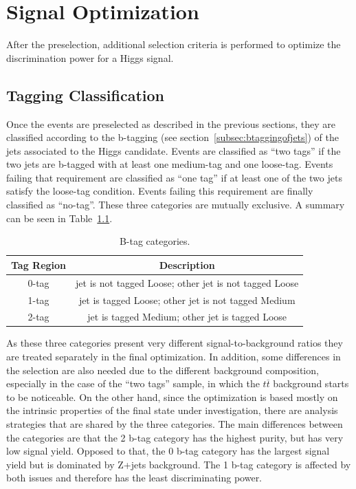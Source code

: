 

\chapter{Signal Optimization}


After the preselection, additional selection criteria is performed to optimize the discrimination power for a Higgs signal.

\section{Tagging Classification}

Once the events are preselected as described in the previous sections, they are classified according to the b-tagging (see section~\ref{subsec:btaggingofjets})  of the jets associated to the Higgs candidate. Events are classified as ``two tags'' if the two jets are b-tagged with at least one medium-tag and one loose-tag. Events failing that requirement are classified as ``one tag'' if at least one of the two jets satisfy the loose-tag condition. Events failing this requirement are finally classified as ``no-tag''.  These three categories are mutually exclusive.  A summary can be seen in Table~\ref{tab:btagcateg}.

\begin{table}[htb!]
\caption{ 
B-tag categories.
}
\label{tab:btagcateg}
\vspace*{\medskipamount}
\begin{center}
\small
\begin{tabular}{|c|c|}
\hline
Tag Region & Description\\
\hline
0-tag & jet is not tagged Loose; other jet is not tagged Loose \\
1-tag & jet is tagged Loose; other jet is not tagged Medium \\
2-tag & jet is tagged Medium; other jet is tagged Loose \\
\hline
\end{tabular}
\end{center}
\end{table}

As these three categories present very different signal-to-background ratios they are treated separately in the final optimization. In addition, some differences in the selection are also needed due to the different background composition, especially in the case of the ``two tags'' sample, in which the $t\overline{t}$ background starts to be noticeable. On the other hand, since the optimization is based mostly on the intrinsic properties of the final state under investigation, there are analysis strategies that are shared by the three categories. The main differences between the categories are that the 2 b-tag category has the highest purity, but has very low signal yield.  Opposed to that, the 0 b-tag category has the largest signal yield but is dominated by Z+jets background. The 1 b-tag category is affected by both issues and therefore has the least discriminating power.

